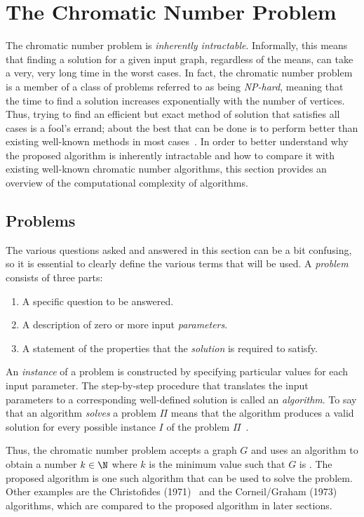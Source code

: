 \section{The Chromatic Number Problem}\label{sec:chromatic}

The chromatic number problem is \emph{inherently intractable}.  Informally, this means that finding a solution for
a given input graph, regardless of the means, can take a very, very long time in the worst cases.  In fact, the
chromatic number problem is a member of a class of problems referred to as being \emph{NP-hard}, meaning that the
time to find a solution increases exponentially with the number of vertices.  Thus, trying to find an efficient but
exact method of solution that satisfies all cases is a fool's errand; about the best that can be done is to perform
better than existing well-known methods in most cases~\cite{garey}.  In order to better understand why the proposed
algorithm is inherently intractable and how to compare it with existing well-known chromatic number algorithms,
this section provides an overview of the computational complexity of algorithms.

\subsection{Problems}\label{sec:sub:problems}

The various questions asked and answered in this section can be a bit confusing, so it is essential to clearly
define the various terms that will be used.  A \emph{problem} consists of three parts:

\begin{enumerate}
\item A specific question to be answered.
\item A description of zero or more input \emph{parameters}.
\item A statement of the properties that the \emph{solution} is required to satisfy.
\end{enumerate}

An \emph{instance} of a problem is constructed by specifying particular values for each input parameter.  The
step-by-step procedure that translates the input parameters to a corresponding well-defined solution is called an
\emph{algorithm}.  To say that an algorithm \emph{solves} a problem \(\Pi\) means that the algorithm produces a
valid solution for every possible instance \(I\) of the problem \(\Pi\)~\cite{garey}.

Thus, the chromatic number problem accepts a graph \(G\) and uses an algorithm to obtain a number \(k\in\N\) where
\(k\) is the minimum value such that \(G\) is .  The proposed algorithm is one such algorithm that can
be used to solve the problem.  Other examples are the Christofides (1971)~\cite{christofides} and the Corneil/Graham
(1973)~\cite{corneil} algorithms, which are compared to the proposed algorithm in later sections.

